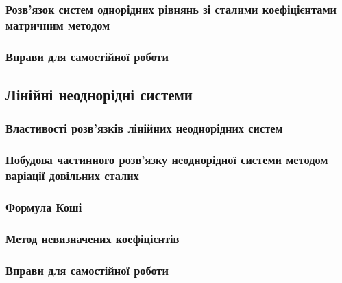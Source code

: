 		\subsubsection{Розв'язок систем однорідних рівнянь зі сталими коефіцієнтами матричним методом}
		

		\subsubsection{Вправи для самостійної роботи}
		

	\subsection{Лінійні неоднорідні системи}
	

		\subsubsection{Властивості розв'язків лінійних неоднорідних систем}
		

		\subsubsection{Побудова частинного розв'язку неоднорідної системи методом варіації довільних сталих}
		

		\subsubsection{Формула Коші}
		

		\subsubsection{Метод невизначених коефіцієнтів}
		

		\subsubsection{Вправи для самостійної роботи}

\newpage

\nocite{*}





